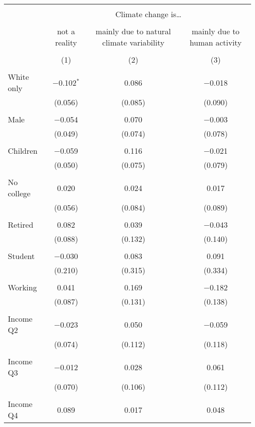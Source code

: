 
\begin{tabular}{@{\extracolsep{5pt}}lccc} 
\\[-1.8ex]\hline 
\hline \\[-1.8ex] 
 & \multicolumn{3}{c}{Climate change is…} \\ 
\cline{2-4} 
\\[-1.8ex] & not a reality & mainly due to natural climate variability & mainly due to human activity \\ 
\\[-1.8ex] & (1) & (2) & (3)\\ 
\hline \\[-1.8ex] 
 White only & $-$0.102$^{*}$ & 0.086 & $-$0.018 \\ 
  & (0.056) & (0.085) & (0.090) \\ 
  & & & \\ 
 Male & $-$0.054 & 0.070 & $-$0.003 \\ 
  & (0.049) & (0.074) & (0.078) \\ 
  & & & \\ 
 Children & $-$0.059 & 0.116 & $-$0.021 \\ 
  & (0.050) & (0.075) & (0.079) \\ 
  & & & \\ 
 No college & 0.020 & 0.024 & 0.017 \\ 
  & (0.056) & (0.084) & (0.089) \\ 
  & & & \\ 
 Retired & 0.082 & 0.039 & $-$0.043 \\ 
  & (0.088) & (0.132) & (0.140) \\ 
  & & & \\ 
 Student & $-$0.030 & 0.083 & 0.091 \\ 
  & (0.210) & (0.315) & (0.334) \\ 
  & & & \\ 
 Working & 0.041 & 0.169 & $-$0.182 \\ 
  & (0.087) & (0.131) & (0.138) \\ 
  & & & \\ 
 Income Q2 & $-$0.023 & 0.050 & $-$0.059 \\ 
  & (0.074) & (0.112) & (0.118) \\ 
  & & & \\ 
 Income Q3 & $-$0.012 & 0.028 & 0.061 \\ 
  & (0.070) & (0.106) & (0.112) \\ 
  & & & \\ 
 Income Q4 & 0.089 & 0.017 & 0.048 \\ 

\end{tabular}
